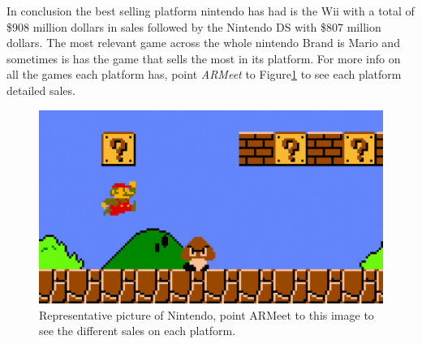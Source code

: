 In conclusion the best selling platform nintendo has had is the Wii with a
total of \$908 million dollars in sales followed by the Nintendo DS with \$807
million dollars. The most relevant game across the whole nintendo Brand is
Mario and sometimes is has the game that sells the most in its platform. For
more info on all the games each platform has, point \textit{ARMeet} to
Figure\ref{fig:NintendoImage} to see each platform detailed sales.


\begin{figure}[h]
  \centering
  \centerline{\includegraphics[scale=0.3]{images/NintendoMainTarget.png}}
  \caption{Representative picture of Nintendo, point ARMeet to this image to
    see the different sales on each platform.}
  \label{fig:NintendoImage}
\end{figure}


